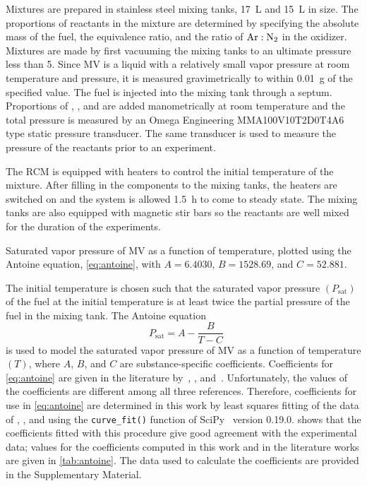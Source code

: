 \documentclass[letterpaper, review, sort&compress]{elsarticle}
\newcommand*{\logten}{\mathop{\log_{10}}}
\begin{document}
Mixtures are prepared in stainless steel mixing tanks, \SI{17}{\L} and \SI{15}{\L} in size. The
proportions of reactants in the mixture are determined by specifying the absolute mass of the fuel,
the equivalence ratio, and the ratio of \(\ce{Ar}:\ce{N2}\) in the oxidizer. Mixtures are
made by first vacuuming the mixing tanks to an ultimate pressure less than \SI{5}{\torr}. Since MV
is a liquid with a relatively small vapor pressure at room temperature and pressure, it is measured
gravimetrically to within \SI{0.01}{\g} of the specified value. The fuel is injected into the mixing
tank through a septum. Proportions of , , and  are added manometrically at room
temperature and the total pressure is measured by an Omega Engineering MMA100V10T2D0T4A6 type static
pressure transducer. The same transducer is used to measure the pressure of the reactants prior to
an experiment.

The RCM is equipped with heaters to control the initial temperature of the mixture. After filling in
the components to the mixing tanks, the heaters are switched on and the system is allowed
\SI{1.5}{\hour} to come to steady state. The mixing tanks are also equipped with magnetic stir bars
so the reactants are well mixed for the duration of the experiments.

\begin{center}
    \captionsetup{type=figure}
    
    \caption{Saturated vapor pressure of MV as a function of temperature,
    plotted using the Antoine equation, \cref{eq:antoine}, with
    \(A=6.4030\), \(B=1528.69\), and \(C=52.881\).}
    \label{fig:vapor-pressure}
\end{center}

The initial temperature is chosen such that the saturated vapor pressure \((P_{\text{sat}})\) of the
fuel at the initial temperature is at least twice the partial pressure of the fuel in the mixing
tank. The Antoine equation
%
\begin{equation}\label{eq:antoine}
    \logten{P_{\text{sat}}} = A - \frac{B}{T - C}
\end{equation}
%
is used to model the saturated vapor pressure of MV as a function of temperature \((T)\), where
\(A\), \(B\), and \(C\) are substance-specific coefficients. Coefficients for \cref{eq:antoine} are
given in the literature by~\citet{Ortega2003}, \citet{Camacho2007}, and~\citet{Stephenson1987}.
Unfortunately, the values of the coefficients are different among all three references. Therefore,
coefficients for use in \cref{eq:antoine} are determined in this work by least squares fitting of
the data of \citet{Ortega2003}, \citet{vanGenderen2002}, and \citet{Verevkin2008} using the
\verb|curve_fit()| function of SciPy~\cite{Jones2001} version 0.19.0. 
shows that the coefficients fitted with this procedure give good agreement with the experimental
data; values for the coefficients computed in this work and in the literature works are given in
\cref{tab:antoine}. The data used to calculate the coefficients are provided in the Supplementary
Material.
\end{document}
